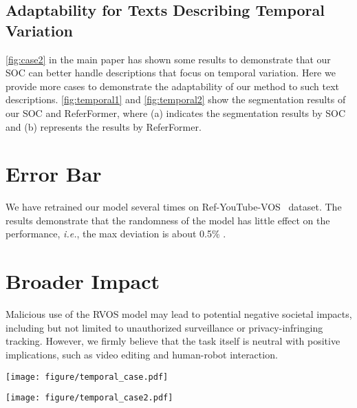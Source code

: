 \documentclass{article}
\begin{document}
\subsection{Adaptability for Texts Describing Temporal Variation} \label{app:adaptability}

\cref{fig:case2} in the main paper has shown some results to demonstrate that our SOC can better handle descriptions that focus on temporal variation.
Here we provide more cases to demonstrate the adaptability of our method to such text descriptions. \cref{fig:temporal1} and \cref{fig:temporal2} show the segmentation results of our SOC and ReferFormer, where (a) indicates the segmentation results by SOC and (b) represents the results by ReferFormer\cite{referformer}.



\section{Error Bar}
We have retrained our model several times on Ref-YouTube-VOS~\cite{urvos} dataset. The results demonstrate that the randomness of the model has little effect on the performance, \textit{i.e.}, the max deviation is about 0.5\% . 

\section{Broader Impact}
Malicious use of the RVOS model may lead to potential negative societal impacts, including but not limited to unauthorized surveillance or privacy-infringing tracking. However, we firmly believe that the task itself is neutral with positive implications, such as video editing and human-robot interaction.
\begin{figure*}
    \centering
    \texttt{[image: figure/temporal\_case.pdf]}
    \caption{Visualization comparison using text expressions about temporal variation. (a) and (b) are segmentation results of our SOC and ReferFormer~\cite{referformer}, respectively.}
    \label{fig:temporal1}
    \vspace{-10pt}
\end{figure*}


\begin{figure*}[h]
    \centering
    \texttt{[image: figure/temporal\_case2.pdf]}
    \caption{Visualization comparison using text expressions about temporal variation. (a) and (b) are segmentation results of our SOC and ReferFormer~\cite{referformer}, respectively.}
    \label{fig:temporal2}
\end{figure*}
\end{document}

